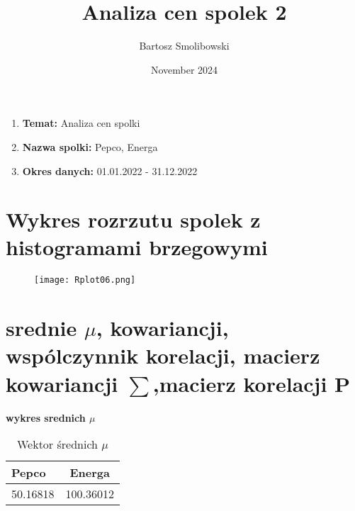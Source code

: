 \documentclass{article}
\begin{document}
\title{Analiza cen spolek 2}
\author{Bartosz Smolibowski}
\date{November 2024}

\maketitle

\begin{enumerate}
    \item \textbf{Temat: }Analiza cen spolki
    \item \textbf{Nazwa  spolki: } Pepco, Energa
    \item \textbf{Okres danych: }01.01.2022 - 31.12.2022
\end{enumerate}

\vspace{12pt}

\section{Wykres rozrzutu spolek z histogramami brzegowymi}

\begin{figure}[h]
    \centering
    \texttt{[image: Rplot06.png]}
    
\end{figure}

\clearpage 

\section{srednie $\mu$, kowariancji, wspólczynnik korelacji, macierz kowariancji $\sum$,macierz korelacji P}

\vspace{12pt}

\textbf{wykres srednich $\mu$ }

\begin{table}[h]
    \centering
    \begin{tabular}{lc}
        \toprule
        \textbf{Pepco} & \textbf{Energa} \\
        \midrule
         50.16818  & 100.36012  \\
    
        \bottomrule
    \end{tabular}
    \caption{Wektor średnich $\mu$}
    \label{tab:mean_vector}
\end{table}

\vspace{30pt}
\end{document}

